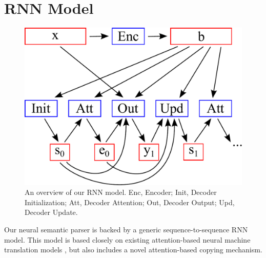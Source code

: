 \documentclass[11pt,letterpaper]{article}
\newcommand\pl[1]{\textcolor{red}{[PL: #1]}}
\newcommand\rj[1]{\textcolor{blue}{[RJ: #1]}}
\renewcommand\pl[1]{}
\renewcommand\rj[1]{}
\begin{document}

\section{RNN Model}
\begin{figure}[t] 
\small
\begin{center} 
  \includegraphics[scale=0.4]{fig-rnn.pdf}
\end{center} 
\caption{An overview of our RNN model.  
  Enc, Encoder; Init, Decoder Initialization;
  Att, Decoder Attention; Out, Decoder Output;
  Upd, Decoder Update.
}
\label{fig:rnn}
\end{figure}
Our neural semantic parser is backed by a generic sequence-to-sequence RNN model.
This model is based closely on existing 
attention-based neural machine translation models
\cite{bahdanau2014neural,luong2015translation},
but also includes a novel attention-based copying mechanism.

\pl{we should have a paragraph after our description
  or in discussion comparing our model with neural MT models;
  doing a careful diff is important }
  \rj{It's basically the same as Thang's other than the output module}
\end{document}

